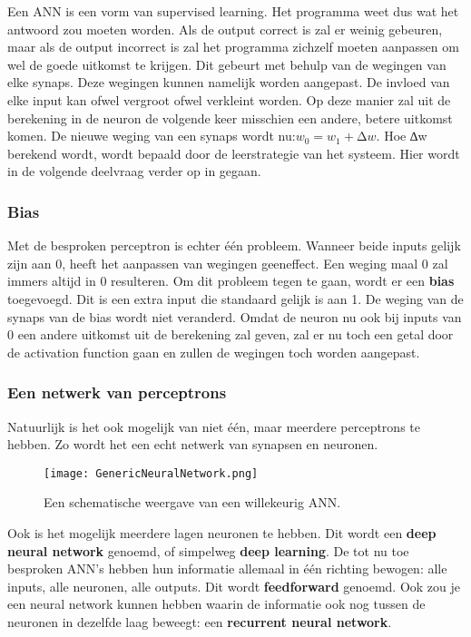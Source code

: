 Een ANN is een vorm van supervised learning. Het programma weet dus wat het antwoord zou moeten worden. Als de output correct is zal er weinig gebeuren, maar als de output incorrect is zal het programma zichzelf moeten aanpassen om wel de goede uitkomst te krijgen. Dit gebeurt met behulp van de wegingen van elke synaps. Deze wegingen kunnen namelijk worden aangepast. De invloed van elke input kan ofwel vergroot ofwel verkleint worden. Op deze manier zal uit de berekening in de neuron de volgende keer misschien een andere, betere uitkomst komen. De nieuwe weging van een synaps wordt nu:$ w_{0} = w_{1} + ∆w $.
Hoe ∆w berekend wordt, wordt bepaald door de leerstrategie van het systeem. Hier wordt in de volgende deelvraag verder op in gegaan.

\subsubsection{Bias}
Met de besproken perceptron is echter één probleem. Wanneer beide inputs gelijk zijn aan 0, heeft het aanpassen van wegingen geeneffect. Een weging maal 0 zal immers altijd in 0 resulteren. Om dit probleem tegen te gaan, wordt er een \textbf{bias} toegevoegd. Dit is een extra input die standaard gelijk is aan 1. De weging van de synaps van de bias wordt niet veranderd. Omdat de neuron nu ook bij inputs van 0 een andere uitkomst uit de berekening zal geven, zal er nu toch een getal door de activation function gaan en zullen de wegingen toch worden aangepast. 

\subsubsection{Een netwerk van perceptrons}
Natuurlijk is het ook mogelijk van niet één, maar meerdere perceptrons te hebben. Zo wordt het een echt netwerk van synapsen en neuronen.

\begin{figure}[h]
  \centering
    \texttt{[image: GenericNeuralNetwork.png]}
  \caption{Een schematische weergave van een willekeurig ANN.}
  \label{fig:ANN}
\end{figure}

Ook is het mogelijk meerdere lagen neuronen te hebben. Dit wordt een \textbf{deep neural network} genoemd, of simpelweg \textbf{deep learning}.
De tot nu toe besproken ANN’s hebben hun informatie allemaal in één richting bewogen: alle inputs, alle neuronen, alle outputs. Dit wordt \textbf{feedforward} genoemd. Ook zou je een neural network kunnen hebben waarin de informatie ook nog tussen de neuronen in dezelfde laag beweegt: een \textbf{recurrent neural network}.

